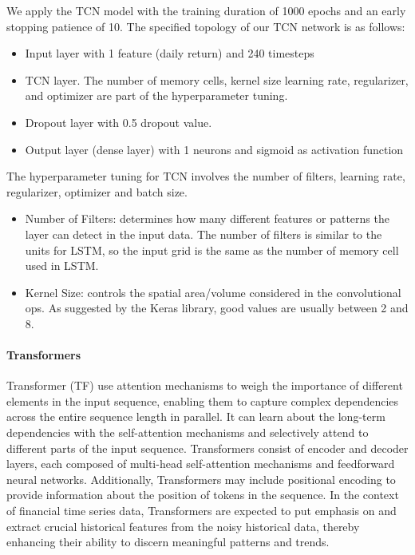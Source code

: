 \documentclass{article}
\begin{document}
We apply the TCN model with the training duration of 1000 epochs and an early stopping patience of 10. The specified topology of our TCN network is as follows:
\begin{itemize}
  \item Input layer with 1 feature (daily return) and 240 timesteps
  \item TCN layer. The number of memory cells, kernel size learning rate, regularizer, and optimizer are part of the hyperparameter tuning. 
  \item Dropout layer with 0.5 dropout value.
  \item Output layer (dense layer) with 1 neurons and sigmoid as activation function
\end{itemize}
The hyperparameter tuning for TCN involves the number of filters, learning rate, regularizer, optimizer and batch size. 
\begin{itemize}
  \item Number of Filters: determines how many different features or patterns the layer can detect in the input data. The number of filters is similar to the units for LSTM, so the input grid is the same as the number of memory cell used in LSTM. 
  \item Kernel Size: controls the spatial area/volume considered in the convolutional ops. As suggested by the Keras library, good values are usually between 2 and 8. 
\end{itemize}

\paragraph{Transformers}
Transformer (TF) use attention mechanisms to weigh the importance of different elements in the input sequence, enabling them to capture complex dependencies across the entire sequence length in parallel. It can learn about the long-term dependencies with the self-attention mechanisms and selectively attend to different parts of the input sequence. Transformers consist of encoder and decoder layers, each composed of multi-head self-attention mechanisms and feedforward neural networks. Additionally, Transformers may include positional encoding to provide information about the position of tokens in the sequence. In the context of financial time series data, Transformers are expected to put emphasis on and extract crucial historical features from the noisy historical data, thereby enhancing their ability to discern meaningful patterns and trends.
\end{document}
